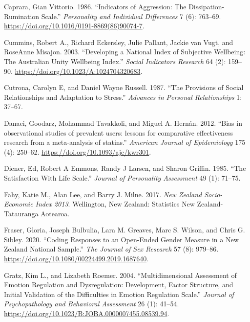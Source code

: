 \documentclass[
  singlecolumn]{report}
\newlength{\cslhangindent}
\newlength{\cslentryspacingunit} %
\newenvironment{CSLReferences}[2] %
 {%
  \setlength{\parindent}{0pt}
  \ifodd #1
  \let\oldpar\par
  \def\par{\hangindent=\cslhangindent\oldpar}
  \fi
  \setlength{\parskip}{#2\cslentryspacingunit}
 }%
 {}
\begin{document}
\begin{CSLReferences}{1}{0}
\leavevmode{}%
Caprara, Gian Vittorio. 1986. {``Indicators of Aggression: The
Dissipation-Rumination Scale.''} \emph{Personality and Individual
Differences} 7 (6): 763--69.
\url{https://doi.org/10.1016/0191-8869(86)90074-7}.

\leavevmode{}%
Cummins, Robert A., Richard Eckersley, Julie Pallant, Jackie van Vugt,
and RoseAnne Misajon. 2003. {``Developing a National Index of Subjective
Wellbeing: The Australian Unity Wellbeing Index.''} \emph{Social
Indicators Research} 64 (2): 159--90.
\url{https://doi.org/10.1023/A:1024704320683}.

\leavevmode{}%
Cutrona, Carolyn E, and Daniel Wayne Russell. 1987. {``The Provisions of
Social Relationships and Adaptation to Stress.''} \emph{Advances in
Personal Relationships} 1: 37--67.

\leavevmode{}%
Danaei, Goodarz, Mohammad Tavakkoli, and Miguel A. Hernán. 2012. {``Bias
in observational studies of prevalent users: lessons for comparative
effectiveness research from a meta-analysis of statins.''}
\emph{American Journal of Epidemiology} 175 (4): 250--62.
\url{https://doi.org/10.1093/aje/kwr301}.

\leavevmode{}%
Diener, Ed, Robert A Emmons, Randy J Larsen, and Sharon Griffin. 1985.
{``The Satisfaction With Life Scale.''} \emph{Journal of Personality
Assessment} 49 (1): 71--75.

\leavevmode{}%
Fahy, Katie M., Alan Lee, and Barry J. Milne. 2017. \emph{New Zealand
Socio-Economic Index 2013}. Wellington, New Zealand: Statistics New
Zealand-Tatauranga Aotearoa.

\leavevmode{}%
Fraser, Gloria, Joseph Bulbulia, Lara M. Greaves, Marc S. Wilson, and
Chris G. Sibley. 2020. {``Coding Responses to an Open-Ended Gender
Measure in a New Zealand National Sample.''} \emph{The Journal of Sex
Research} 57 (8): 979--86.
\url{https://doi.org/10.1080/00224499.2019.1687640}.

\leavevmode{}%
Gratz, Kim L., and Lizabeth Roemer. 2004. {``Multidimensional Assessment
of Emotion Regulation and Dysregulation: Development, Factor Structure,
and Initial Validation of the Difficulties in Emotion Regulation
Scale.''} \emph{Journal of Psychopathology and Behavioral Assessment} 26
(1): 41--54. \url{https://doi.org/10.1023/B:JOBA.0000007455.08539.94}.


\end{CSLReferences}
\end{document}
